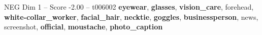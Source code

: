 \begin{textsample}{NEG Dim 1 – Score -2.00 – t006002}  \label{ex:f1_neg_010}
\textbf{eyewear}, \textbf{glasses}, \textbf{vision\_care}, forehead, \textbf{white-collar\_worker}, \textbf{facial\_hair}, \textbf{necktie}, \textbf{goggles}, \textbf{businessperson}, news, screenshot, \textbf{official}, \textbf{moustache}, \textbf{photo\_caption}

\end{textsample}
